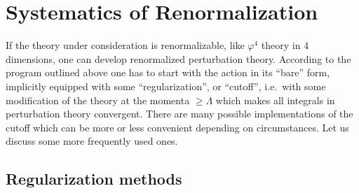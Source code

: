 \section{Systematics of Renormalization}

\newcommand{\legs}[1]{\foreach \p/\a/\n in {#1} {\draw[prop,densely dashed] (\p) -- ++(\a:1.1) node[pos=1.18,font=\tiny] {\n};}}
\newcommand{\bubS}{\diac[0.4]{\coordinate (L) at (-0.9,0); \coordinate (R) at (0.9,0);
  \draw[prop] (0,0) ellipse (0.9 and 0.55); \legs{L/135/1,L/225/2,R/45/3,R/315/4}
  \node[vtx] at (L) {}; \node[vtx] at (R) {};}}
\newcommand{\bubT}{\diac[0.4]{\coordinate (T) at (0,0.8); \coordinate (B) at (0,-0.8);
  \draw[prop] (0,0) ellipse (0.55 and 0.8); \legs{T/150/1,T/30/3,B/210/2,B/330/4}
  \node[vtx] at (T) {}; \node[vtx] at (B) {};}}
\newcommand{\bubU}{\diac[0.4]{\coordinate (T) at (0,0.8); \coordinate (B) at (0,-0.8);
  \draw[prop] (0,0) ellipse (0.55 and 0.8);
  \draw[prop,densely dashed] (T) -- ++(150:1.1) node[pos=1.18,font=\tiny] {1};
  \draw[prop,densely dashed] (B) -- ++(210:1.1) node[pos=1.18,font=\tiny] {2};
  \draw[prop,densely dashed] (T) .. controls (0.9,0.6) and (0.7,-1.4) .. (1.2,-1.6) node[right,font=\tiny] {4};
  \draw[prop,densely dashed] (B) .. controls (0.9,-0.6) and (0.7,1.4) .. (1.2,1.6) node[right,font=\tiny] {3};
  \node[vtx] at (T) {}; \node[vtx] at (B) {};}}
\newcommand{\ctX}[1]{\diac[0.4]{\coordinate (O) at (0,0); \legs{O/135/1,O/225/2,O/45/3,O/315/4}
  \node[otimesv,minimum size=5pt] at (O) {}; \node[font=\tiny] at (0,0.55) {(#1)};}}
\newcommand{\ctline}[1]{\dia[0.4]{\draw[prop,densely dashed] (-2,0) -- (2,0); \node[otimesv,minimum size=5pt] at (0,0) {}; \node[font=\tiny] at (0,0.55) {(#1)};}}

If the theory under consideration is renormalizable, like $\varphi^4$ theory in
4 dimensions, one can develop renormalized perturbation theory. According to the
program outlined above one has to start with the action in its ``bare'' form,
implicitly equipped with some ``regularization'', or ``cutoff'', i.e.\ with some
modification of the theory at the momenta $\ge\Lambda$ which makes all integrals
in perturbation theory convergent. There are many possible implementations of
the cutoff which can be more or less convenient depending on circumstances. Let
us discuss some more frequently used ones.

\subsection*{Regularization methods}


